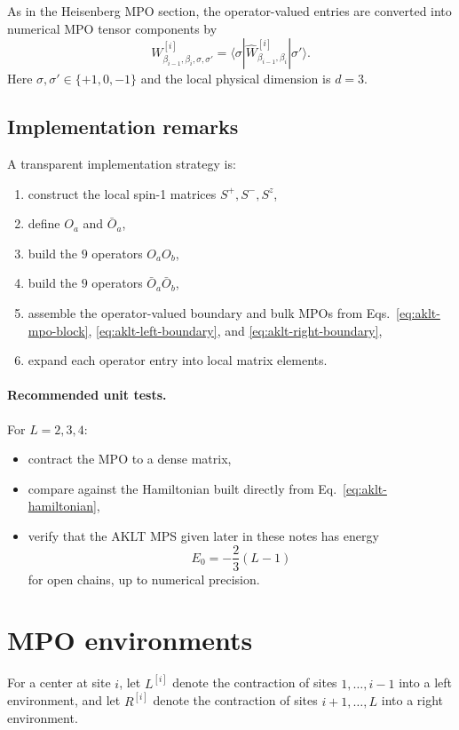 \documentclass[aps,prb,onecolumn,nofootinbib]{revtex4-2}
\newcommand{\ket}[1]{|#1\rangle}
\newcommand{\bra}[1]{\langle #1|}
\begin{document}
	As in the Heisenberg MPO section, the operator-valued entries are converted into numerical MPO tensor components by
	\begin{equation}
		W^{[i]}_{\beta_{i-1},\beta_i,\sigma,\sigma'}
		=
		\bra{\sigma}
		\hat W^{[i]}_{\beta_{i-1},\beta_i}
		\ket{\sigma'}.
	\end{equation}
	Here $\sigma,\sigma'\in\{+1,0,-1\}$ and the local physical dimension is $d=3$.
	
	\subsection{Implementation remarks}
	
	A transparent implementation strategy is:
	\begin{enumerate}
		\item construct the local spin-1 matrices $S^+,S^-,S^z$,
		\item define $O_a$ and $\bar O_a$,
		\item build the $9$ operators $O_a O_b$,
		\item build the $9$ operators $\bar O_a\bar O_b$,
		\item assemble the operator-valued boundary and bulk MPOs from
		Eqs.~\eqref{eq:aklt-mpo-block}, \eqref{eq:aklt-left-boundary}, and \eqref{eq:aklt-right-boundary},
		\item expand each operator entry into local matrix elements.
	\end{enumerate}
	
	\paragraph{Recommended unit tests.}
	For $L=2,3,4$:
	\begin{itemize}
		\item contract the MPO to a dense matrix,
		\item compare against the Hamiltonian built directly from Eq.~\eqref{eq:aklt-hamiltonian},
		\item verify that the AKLT MPS given later in these notes has energy
		\[
		E_0 = -\frac{2}{3}(L-1)
		\]
		for open chains, up to numerical precision.
	\end{itemize}
	
	\section{MPO environments}
	\label{sec:env}
	
	For a center at site $i$, let $L^{[i]}$ denote the contraction of sites
	$1,\dots,i-1$ into a left environment, and let $R^{[i]}$ denote the contraction
	of sites $i+1,\dots,L$ into a right environment.
	
\end{document}
